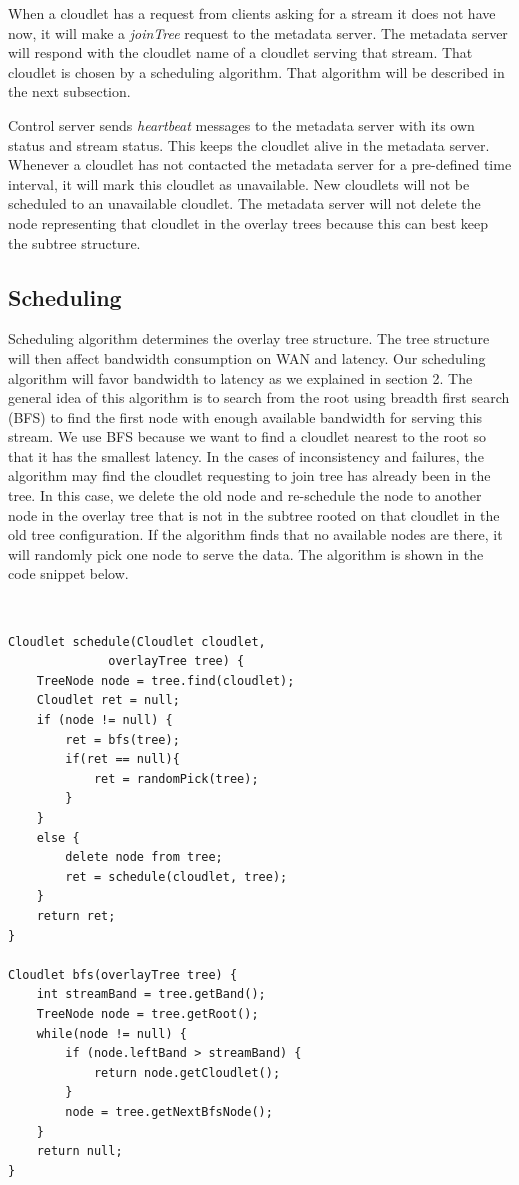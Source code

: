 \documentclass[letterpaper,twocolumn,10pt]{article}
\begin{document}
When a cloudlet has a request from clients asking for a stream it does not have now, it will make a \emph{joinTree} request to the metadata server. The metadata server will respond with the cloudlet name of a cloudlet serving that stream. That cloudlet is chosen by a scheduling algorithm. That algorithm will be described in the next subsection. 

Control server sends \emph{heartbeat} messages to the metadata server with its own status and stream status. This keeps the cloudlet alive in the metadata server. Whenever a cloudlet has not contacted the metadata server for a pre-defined time interval, it will mark this cloudlet as unavailable. New cloudlets will not be scheduled to an unavailable cloudlet. The metadata server will not delete the node representing that cloudlet in the overlay trees because this can best keep the subtree structure. 

\subsection{Scheduling}
Scheduling algorithm determines the overlay tree structure. The tree structure will then affect bandwidth consumption on WAN and latency. Our scheduling algorithm will favor bandwidth to latency as we explained in section 2. The general idea of this algorithm is to search from the root using breadth first search (BFS) to find the first node with enough available bandwidth for serving this stream. We use BFS because we want to find a cloudlet nearest to the root so that it has the smallest latency. In the cases of inconsistency and failures, the algorithm may find the cloudlet requesting to join tree has already been in the tree. In this case, we delete the old node and re-schedule the node to another node in the overlay tree that is not in the subtree rooted on that cloudlet in the old tree configuration. If the algorithm finds that no available nodes are there, it will randomly pick one node to serve the data. The algorithm is shown in the code snippet below. 

{\tt \small
\begin{verbatim}
Cloudlet schedule(Cloudlet cloudlet,
              overlayTree tree) {
    TreeNode node = tree.find(cloudlet);
    Cloudlet ret = null;
    if (node != null) {
        ret = bfs(tree);
        if(ret == null){
            ret = randomPick(tree);
        }
    } 
    else {
        delete node from tree;
        ret = schedule(cloudlet, tree);
    }
    return ret;
}

Cloudlet bfs(overlayTree tree) {
    int streamBand = tree.getBand();
    TreeNode node = tree.getRoot();
    while(node != null) {
        if (node.leftBand > streamBand) {
            return node.getCloudlet();
        }
        node = tree.getNextBfsNode();
    } 
    return null;
}

\end{verbatim}
}
\end{document}
